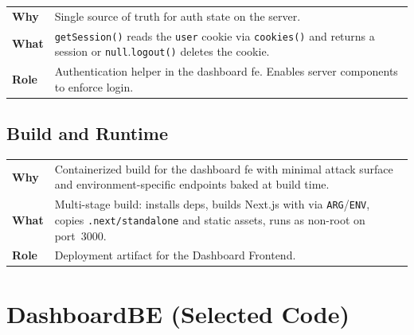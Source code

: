 \documentclass[11pt, a4paper, oneside, listof=totoc]{scrartcl}
\makeatletter
\newcommand{\codesummary}[3]{%
    \vspace{0.4\baselineskip}%
    \noindent\begin{tabularx}{\linewidth}{@{}>{\bfseries}l X@{}}
    Why  & #1\\
    What & #2\\
    Role & #3\\
    \end{tabularx}%
    \vspace{0.2\baselineskip}%
}
\makeatother
\begin{document}
        \clearpage

                \codesummary
                    {Single source of truth for auth state on the server.}
                    {\texttt{getSession()} reads the \texttt{user} cookie via \texttt{cookies()} and returns a session or \texttt{null}.\@\texttt{logout()} deletes the cookie.}%
                    {Authentication helper in the dashboard \gls{fe}. Enables server components to enforce login.}

        \clearpage

            \subsection{Build and Runtime}
                \codesummary
                    {Containerized build for the dashboard \gls{fe} with minimal attack surface and environment-specific endpoints baked at build time.}
                    {Multi-stage build: installs deps, builds Next.js with \texttt{\detokenize{CONFIG_ENDPOINT}} via \texttt{ARG}/\texttt{ENV}, copies \texttt{.next/standalone} and static assets, runs as non-root on port~3000.}
                    {Deployment artifact for the Dashboard Frontend.}

        \clearpage

        \section{DashboardBE (Selected Code)}\label{app:dashboardbe}
\end{document}
